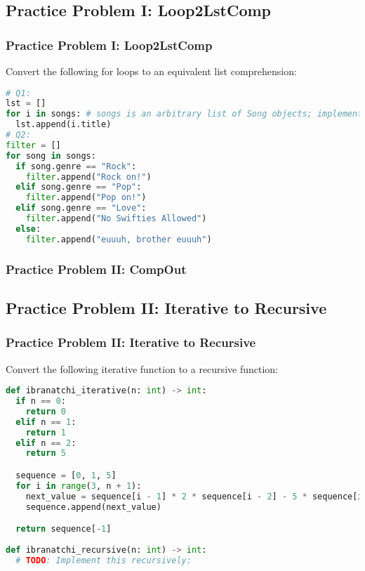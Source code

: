 \documentclass[hyperref={colorlinks,citecolor=blue,linkcolor=blue,urlcolor=blue}]{beamer}
\begin{document}
\subsection{Practice Problem I: Loop2LstComp}
\begin{frame}[fragile]
  
  \frametitle{Practice Problem I: Loop2LstComp}

  Convert the following for loops to an equivalent list comprehension:
  \begin{lstlisting}[language=Python, style=mystyle]
# Q1: 
lst = []
for i in songs: # songs is an arbitrary list of Song objects; implementation is irrelevant for this question 
  lst.append(i.title)
# Q2:
filter = []
for song in songs:
  if song.genre == "Rock":
    filter.append("Rock on!")
  elif song.genre == "Pop":
    filter.append("Pop on!")
  elif song.genre == "Love":
    filter.append("No Swifties Allowed")
  else:
    filter.append("euuuh, brother euuuh")
\end{lstlisting}

\end{frame}


\begin{frame}[fragile]
  \frametitle{Practice Problem II: CompOut}


\end{frame}


\subsection{Practice Problem II: Iterative to Recursive}

\begin{frame}[fragile]
  \frametitle{Practice Problem II: Iterative to Recursive}
  
  Convert the following iterative function to a recursive function:

  \begin{lstlisting}[language=Python, style=mystyle]
def ibranatchi_iterative(n: int) -> int:
  if n == 0:
    return 0
  elif n == 1:
    return 1
  elif n == 2:
    return 5

  sequence = [0, 1, 5]
  for i in range(3, n + 1):
    next_value = sequence[i - 1] * 2 * sequence[i - 2] - 5 * sequence[i - 3]
    sequence.append(next_value)

  return sequence[-1]
 
def ibranatchi_recursive(n: int) -> int:
  # TODO: Implement this recursively:

  \end{lstlisting}
\end{frame}
\end{document}
